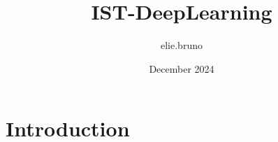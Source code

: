 \documentclass{article}
\title{IST-DeepLearning}
\author{elie.bruno }
\date{December 2024}
\begin{document}
\maketitle

\section{Introduction}
\end{document}
